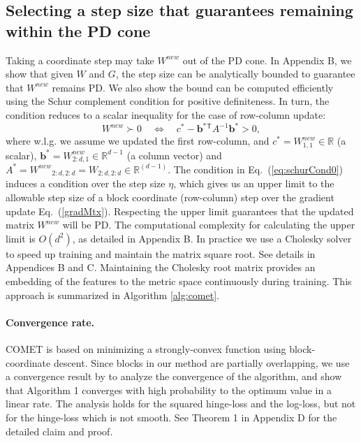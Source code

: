 \documentclass[twoside,11pt]{article}
\newcommand\mat[1]{{#1}}
\renewcommand\vec[1]{\mathbf{#1}}
\newcommand{\T}{{}^\mathsf{T}}
\newcommand{\W}{\mat{W}}
\newcommand{\newW}{{\mat{W^{new}}}}
\newcommand{\R}{\mathbb{R}}
\newcommand{\cholL}{\mat{L}}
\newcommand{\B}{\vec{b}}
\newcommand{\C}{c}
\newcommand{\invA}{A^{-1}}
\newcommand{\Wvec}{\W_{2:d,1}}
\newcommand{\Wscalar}{\W_{1,1}}
\renewcommand{\eqref}[1]{Eq.~(\ref{#1})}
\begin{document}
\subsection{Selecting a step size that guarantees remaining within the PD cone}\label{subsec:step} \vskip -4pt
Taking a coordinate step may take $\newW$ out of the PD cone. In Appendix B, we show that given $\W$ and $\mat{G}$, the step size can be analytically bounded to guarantee that $\newW$ remains PD. We also show the bound can be computed efficiently using the Schur complement condition for positive definiteness. In turn, the condition reduces to a scalar inequality for the case of row-column update:
\begin{equation}\label{eq:schurCond0}
  \newW \succ  0 \quad \Leftrightarrow \quad  \C^* - \B^*\T \invA \B^* >  0,
\end{equation}
where w.l.g. we assume we updated the first row-column, and $\C^* = \Wscalar^{new} \in \R$ (a scalar), $\B^* = \Wvec^{new} \in \R^{d-1}$ (a column vector) and $A^* = \newW_{2:d,2:d} = \W_{2:d,2:d}\in \R^{(d-1)}$. The condition in \eqref{eq:schurCond0} induces a condition over the step size $\eta$, which gives us an upper limit to the allowable step size of a block coordinate (row-column) step over the gradient update \eqref{gradMtx}. Respecting the upper limit guarantees that the updated matrix $\W^{new}$ will be PD. The computational complexity for calculating the upper limit is $O(d^2)$, as  detailed in Appendix B. In practice we use a Cholesky solver \citep{CHOLMOD} to speed up training and maintain the matrix square root. See details in Appendices B and C.
Maintaining the Cholesky root matrix provides an embedding of the features to the metric space continuously during  training. This approach is summarized in Algorithm \ref{alg:comet}.
\paragraph{Convergence rate.}
COMET is based on minimizing a strongly-convex function using block-coordinate descent. Since blocks in our method are partially overlapping, we use a convergence result by \citet{richtarik2013optimal} to analyze the convergence of the algorithm, and show that Algorithm 1 converges with high probability to the optimum value in a linear rate. The analysis holds for the squared hinge-loss and the log-loss, but not for the hinge-loss which is not smooth. See Theorem 1 in Appendix D for the detailed claim and proof.
\end{document}
